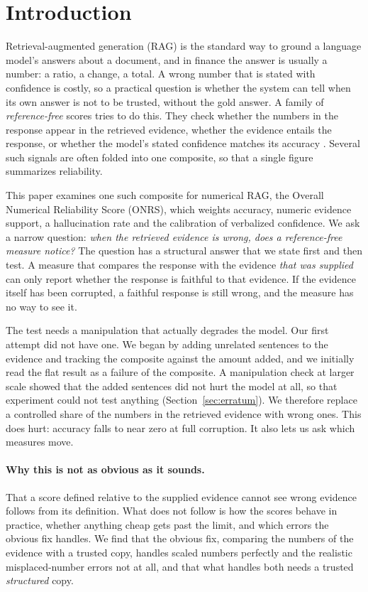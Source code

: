 \section{Introduction}

Retrieval-augmented generation (RAG) is the standard way to ground a language model's answers about a document, and in finance the answer is usually a number: a ratio, a change, a total.
A wrong number that is stated with confidence is costly, so a practical question is whether the system can tell when its own answer is not to be trusted, without the gold answer.
A family of \emph{reference-free} scores tries to do this.
They check whether the numbers in the response appear in the retrieved evidence, whether the evidence entails the response, or whether the model's stated confidence matches its accuracy \citep{es2024ragas,saadfalcon2024ares,min2023factscore}.
Several such signals are often folded into one composite, so that a single figure summarizes reliability.

This paper examines one such composite for numerical RAG, the Overall Numerical Reliability Score (ONRS), which weights accuracy, numeric evidence support, a hallucination rate and the calibration of verbalized confidence.
We ask a narrow question: \emph{when the retrieved evidence is wrong, does a reference-free measure notice?}
The question has a structural answer that we state first and then test.
A measure that compares the response with the evidence \emph{that was supplied} can only report whether the response is faithful to that evidence.
If the evidence itself has been corrupted, a faithful response is still wrong, and the measure has no way to see it.

The test needs a manipulation that actually degrades the model.
Our first attempt did not have one.
We began by adding unrelated sentences to the evidence and tracking the composite against the amount added, and we initially read the flat result as a failure of the composite.
A manipulation check at larger scale showed that the added sentences did not hurt the model at all, so that experiment could not test anything (Section~\ref{sec:erratum}).
We therefore replace a controlled share of the numbers in the retrieved evidence with wrong ones.
This does hurt: accuracy falls to near zero at full corruption.
It also lets us ask which measures move.

\paragraph{Why this is not as obvious as it sounds.}
That a score defined relative to the supplied evidence cannot see wrong evidence follows from its definition. What does not follow is how the scores behave in practice, whether anything cheap gets past the limit, and which errors the obvious fix handles. We find that the obvious fix, comparing the numbers of the evidence with a trusted copy, handles scaled numbers perfectly and the realistic misplaced-number errors not at all, and that what handles both needs a trusted \emph{structured} copy.


